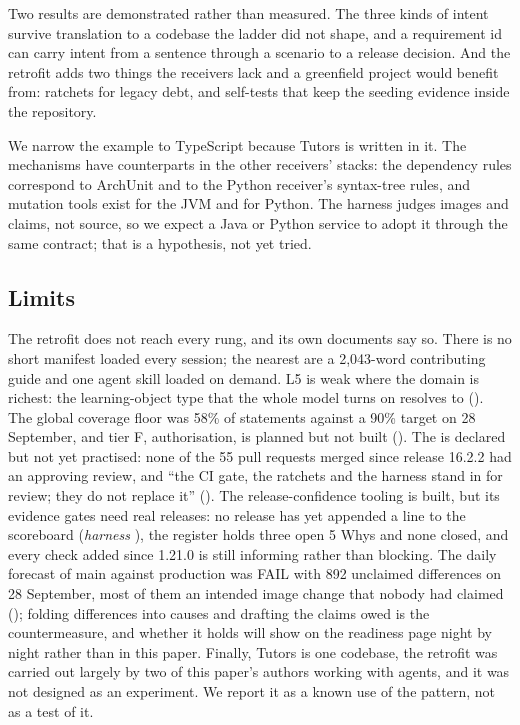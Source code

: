 Two results are demonstrated rather than measured. The three kinds of intent survive translation
to a codebase the ladder did not shape, and a requirement id can carry intent from a sentence
through a scenario to a release decision. And the retrofit adds two things the receivers lack
and a greenfield project would benefit from: ratchets for legacy debt, and self-tests that keep
the seeding evidence inside the repository.

We narrow the example to TypeScript because Tutors is written in it. The mechanisms have
counterparts in the other receivers' stacks: the dependency rules correspond to ArchUnit and to
the Python receiver's syntax-tree rules, and mutation tools exist for the JVM and for Python.
The harness judges images and claims, not source, so we expect a Java or Python service to adopt
it through the same contract; that is a hypothesis, not yet tried.

\subsection{Limits}

The retrofit does not reach every rung, and its own documents say so. There is no short
manifest loaded every session; the nearest are a 2,043-word contributing guide and one agent
skill loaded on demand. L5 is weak where the domain is richest: the learning-object type that
the whole model turns on resolves to 
(). The global coverage floor was 58\% of
statements against a 90\% target on 28 September, and tier F, authorisation, is planned but not built
(). The  is declared but not yet practised: none of the
55 pull requests merged since release 16.2.2 had an approving review, and ``the CI gate, the
ratchets and the harness stand in for review; they do not replace it'' (). The
release-confidence tooling is built, but its evidence gates need real releases: no release has
yet appended a line to the scoreboard (\emph{harness} ), the
register holds three open 5 Whys and none closed, and every check added since 1.21.0 is still
informing rather than blocking. The daily forecast of main against production was FAIL with 892
unclaimed differences on 28 September, most of them an intended image change that nobody had
claimed (); folding differences into causes and
drafting the claims owed is the countermeasure, and whether it holds will show on the readiness
page night by night rather than in this paper. Finally, Tutors is one codebase, the retrofit was
carried out largely by two of this paper's authors working with agents, and it was not designed as an
experiment. We report it as a known use of the pattern, not as a test of it.
